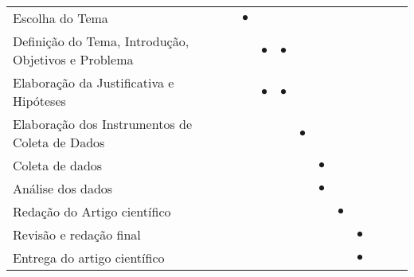 \begin{table}[!ht]
{{\begin{tabular}{lcccccccccc}
\\
\hline
Escolha do Tema                            & \textbf{$\bullet$}   & \textbf{}   & \textbf{}   & \textbf{}    & \textbf{}     & \textbf{}    & \textbf{} & \\
\rowcolor[HTML]{EFEFEF} 
Definição do Tema, Introdução, Objetivos e Problema                             & \textbf{}   & \textbf{$\bullet$}   & \textbf{$\bullet$}   & \textbf{}    & \textbf{}  & \textbf{} & \textbf{}      &        \\
Elaboração da Justificativa e Hipóteses                                          & \textbf{}    & \textbf{$\bullet$}   & \textbf{$\bullet$}   & \textbf{}    & \textbf{} & \textbf{} & \textbf{} &\\
\rowcolor[HTML]{EFEFEF}
Elaboração dos Instrumentos de Coleta de Dados
                                     & \textbf{}    & \textbf{}   & \textbf{}   & \textbf{$\bullet$}    & \textbf{} & \textbf{} & \textbf{} &\\
Coleta de dados                                          & \textbf{}    & \textbf{}   & \textbf{}   & \textbf{}    & \textbf{$\bullet$} & \textbf{} & \textbf{} &\\
\rowcolor[HTML]{EFEFEF}
Análise dos dados                                          & \textbf{}    & \textbf{}   & \textbf{}   & \textbf{}    & \textbf{$\bullet$} & \textbf{} & \textbf{} &\\
Redação do Artigo científico                                          & \textbf{}    & \textbf{}   & \textbf{}   & \textbf{}    & \textbf{} & \textbf{$\bullet$} & \textbf{} &\\
\rowcolor[HTML]{EFEFEF}
Revisão e redação final                                          & \textbf{}    & \textbf{}   & \textbf{}   & \textbf{}    & \textbf{} & \textbf{} & \textbf{$\bullet$} &\\
Entrega do artigo científico                                          & \textbf{}    & \textbf{}   & \textbf{}   & \textbf{}    & \textbf{} & \textbf{} & \textbf{$\bullet$} &\\

\end{tabular}}}
\end{table}
